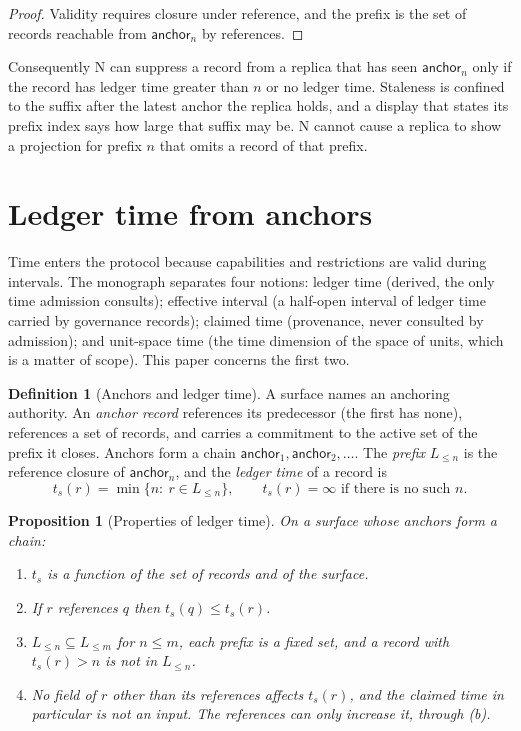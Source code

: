\documentclass[11pt]{article}
\theoremstyle{plain}
\newtheorem{proposition}[theorem]{Proposition}
\theoremstyle{definition}
\newtheorem{definition}[theorem]{Definition}
\theoremstyle{remark}
\begin{document}
\begin{proof}
Validity requires closure under reference, and the prefix is the set of records reachable from $\mathsf{anchor}_n$ by references.
\end{proof}

Consequently N can suppress a record from a replica that has seen $\mathsf{anchor}_n$ only if the record has ledger time greater than $n$ or no ledger time. Staleness is confined to the suffix after the latest anchor the replica holds, and a display that states its prefix index says how large that suffix may be. N cannot cause a replica to show a projection for prefix $n$ that omits a record of that prefix.

\section{Ledger time from anchors}\label{sec:time}

Time enters the protocol because capabilities and restrictions are valid during intervals. The monograph separates four notions: ledger time (derived, the only time admission consults); effective interval (a half-open interval of ledger time carried by governance records); claimed time (provenance, never consulted by admission); and unit-space time (the time dimension of the space of units, which is a matter of scope). This paper concerns the first two.

\begin{definition}[Anchors and ledger time]\label{def:anchor}
A surface names an anchoring authority. An \emph{anchor record} references its predecessor (the first has none), references a set of records, and carries a commitment to the active set of the prefix it closes. Anchors form a chain $\mathsf{anchor}_1,\mathsf{anchor}_2,\dots$. The \emph{prefix} $L_{\le n}$ is the reference closure of $\mathsf{anchor}_n$, and the \emph{ledger time} of a record is
\[
t_s(r)=\min\{n:\ r\in L_{\le n}\},\qquad t_s(r)=\infty\text{ if there is no such }n.
\]
\end{definition}

\begin{proposition}[Properties of ledger time]\label{prop:ledgertime}
On a surface whose anchors form a chain:
\begin{enumerate}[label=(\alph*)]
\item $t_s$ is a function of the set of records and of the surface.
\item If $r$ references $q$ then $t_s(q)\le t_s(r)$.
\item $L_{\le n}\subseteq L_{\le m}$ for $n\le m$, each prefix is a fixed set, and a record with $t_s(r)>n$ is not in $L_{\le n}$.
\item No field of $r$ other than its references affects $t_s(r)$, and the claimed time in particular is not an input. The references can only increase it, through (b).
\end{enumerate}
\end{proposition}
\end{document}
